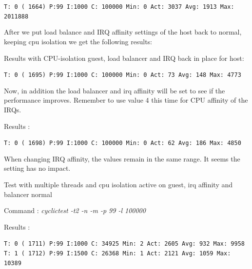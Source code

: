 \documentclass[]{scrartcl}
\begin{document}
\noindent \small \texttt{T: 0 ( 1664) P:99 I:1000 C: 100000 Min:      0 Act: 3037 Avg: 1913 Max:  2011888}


After we put load balance and IRQ affinity settings of the host back to normal, keeping cpu isolation we get the following results:

\bigskip

\noindent Results with CPU-isolation guest, load balancer and IRQ back in place for host:

\noindent \small \texttt{T: 0 ( 1695) P:99 I:1000 C: 100000 Min:      0 Act:   73 Avg:  148 Max:    4773}


Now, in addition the load balancer and irq affinity will be set to see if the performance improves. Remember to use value 4 this time for CPU affinity of the IRQs.
\bigskip

\noindent Results :

\noindent \small \texttt{T: 0 ( 1698) P:99 I:1000 C: 100000 Min:      0 Act:   62 Avg:  186 Max:    4850}

When changing IRQ affinity, the values remain in the same range. It seems the setting has no impact.


Test with multiple threads and cpu isolation active on guest, irq affinity and balancer normal

\noindent Command : \textit{cyclictest -t2 -n -m -p 99 -l 100000}

\noindent Results :

\noindent  
\small \texttt{T: 0 ( 1711) P:99 I:1000 C:  34925 Min:      2 Act: 2605 Avg:  932 Max:    9958}\\
\noindent
\small \texttt{T: 1 ( 1712) P:99 I:1500 C:  26368 Min:      1 Act: 2121 Avg: 1059 Max:   10389}
\end{document}
